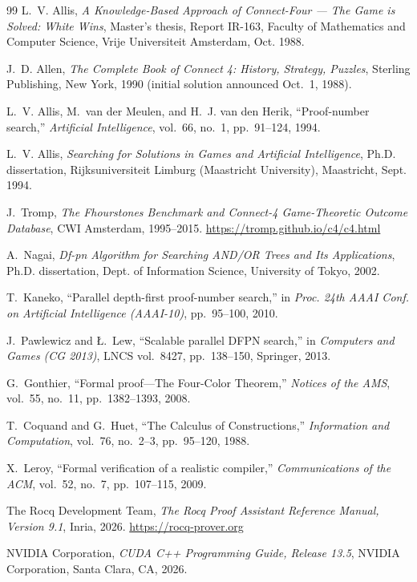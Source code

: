 \documentclass[11pt,reqno]{amsart}
\theoremstyle{plain}
\theoremstyle{definition}
\theoremstyle{remark}
\begin{document}
\begin{thebibliography}{99}
L.~V. Allis, \emph{A Knowledge-Based Approach of Connect-Four --- The Game is Solved: White Wins}, Master's thesis, Report IR-163, Faculty of Mathematics and Computer Science, Vrije Universiteit Amsterdam, Oct. 1988.

J.~D. Allen, \emph{The Complete Book of Connect 4: History, Strategy, Puzzles}, Sterling Publishing, New York, 1990 (initial solution announced Oct.~1, 1988).

L.~V. Allis, M.~van der Meulen, and H.~J. van den Herik, ``Proof-number search,'' \emph{Artificial Intelligence}, vol.~66, no.~1, pp.~91--124, 1994.

L.~V. Allis, \emph{Searching for Solutions in Games and Artificial Intelligence}, Ph.D. dissertation, Rijksuniversiteit Limburg (Maastricht University), Maastricht, Sept. 1994.

J.~Tromp, \emph{The Fhourstones Benchmark and Connect-4 Game-Theoretic Outcome Database}, CWI Amsterdam, 1995--2015. \url{https://tromp.github.io/c4/c4.html}

A.~Nagai, \emph{Df-pn Algorithm for Searching AND/OR Trees and Its Applications}, Ph.D. dissertation, Dept. of Information Science, University of Tokyo, 2002.

T.~Kaneko, ``Parallel depth-first proof-number search,'' in \emph{Proc. 24th AAAI Conf. on Artificial Intelligence (AAAI-10)}, pp.~95--100, 2010.

J.~Pawlewicz and {\L}.~Lew, ``Scalable parallel DFPN search,'' in \emph{Computers and Games (CG 2013)}, LNCS vol.~8427, pp.~138--150, Springer, 2013.

G.~Gonthier, ``Formal proof---The Four-Color Theorem,'' \emph{Notices of the AMS}, vol.~55, no.~11, pp.~1382--1393, 2008.

T.~Coquand and G.~Huet, ``The Calculus of Constructions,'' \emph{Information and Computation}, vol.~76, no.~2--3, pp.~95--120, 1988.

X.~Leroy, ``Formal verification of a realistic compiler,'' \emph{Communications of the ACM}, vol.~52, no.~7, pp.~107--115, 2009.

The Rocq Development Team, \emph{The Rocq Proof Assistant Reference Manual, Version 9.1}, Inria, 2026. \url{https://rocq-prover.org}

NVIDIA Corporation, \emph{CUDA C++ Programming Guide, Release 13.5}, NVIDIA Corporation, Santa Clara, CA, 2026.
\end{thebibliography}
\end{document}
